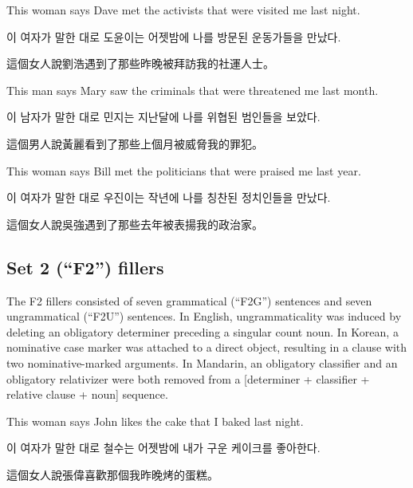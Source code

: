 \pex %
\a[label=E] \ljudge{*}This woman says Dave met the activists that were visited me last night.\par\nobreak
\a[label=K] \ljudge{*}\ko 이 여자가 말한 대로 도윤이는 어젯밤에 나를 방문된 운동가들을 만났다\normalfont.\par\nobreak
\a[label=M] \ljudge{*}\zh 這個女人說劉浩遇到了那些昨晚被拜訪我的社運人士。\normalfont
\xe

\pex %
\a[label=E] \ljudge{*}This man says Mary saw the criminals that were threatened me last month.\par\nobreak
\a[label=K] \ljudge{*}\ko 이 남자가 말한 대로 민지는 지난달에 나를 위협된 범인들을 보았다\normalfont.\par\nobreak
\a[label=M] \ljudge{*}\zh 這個男人說黃麗看到了那些上個月被威脅我的罪犯。\normalfont
\xe

\pex %
\a[label=E] \ljudge{*}This woman says Bill met the politicians that were praised me last year.\par\nobreak
\a[label=K] \ljudge{*}\ko 이 여자가 말한 대로 우진이는 작년에 나를 칭찬된 정치인들을 만났다\normalfont.\par\nobreak
\a[label=M] \ljudge{*}\zh 這個女人說吳強遇到了那些去年被表揚我的政治家。\normalfont
\xe

\subsection{Set 2 (``F2'') fillers}

\vspace{.2cm}

The F2 fillers consisted of seven grammatical (``F2G'') sentences and seven ungrammatical (``F2U'') sentences. In English, ungrammaticality was induced by deleting an obligatory determiner preceding a singular count noun. In Korean, a nominative case marker was attached to a direct object, resulting in a clause with two nominative-marked arguments. In Mandarin, an obligatory classifier and an obligatory relativizer were both removed from a [determiner + classifier + relative clause + noun] sequence.

\vspace{.2cm}

\pex %
\a[label=E] This woman says John likes the cake that I baked last night.\par\nobreak
\a[label=K] \ko 이 여자가 말한 대로 철수는 어젯밤에 내가 구운 케이크를 좋아한다\normalfont.\par\nobreak
\a[label=M] \zh 這個女人說張偉喜歡那個我昨晚烤的蛋糕。\normalfont
\xe

